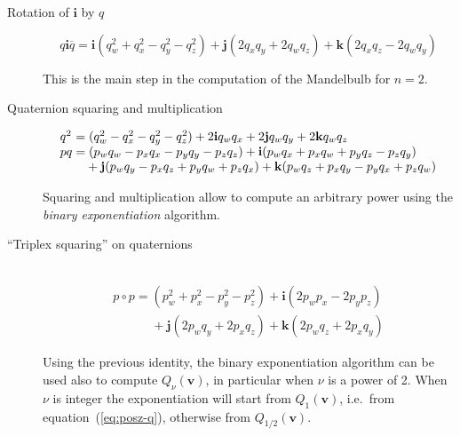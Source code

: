 \documentclass{article}
\let\vec\mathbf
\let\bar\overline
\newcommand{\mathnewlineeq}[1][\quad]{\\\phantom{#1 = }}
\begin{document}
\begin{description}
\item[Rotation of $\vec{i}$ by $q$]
\begin{equation*}
q\vec{i}\bar q =
  \vec{i}(q_w^2+q_x^2-q_y^2-q_z^2) + \vec{j} (2q_x q_y + 2q_w q_z)
  + \vec{k} (2 q_x q_z - 2 q_w q_y)
\end{equation*}

\noindent This is the main step in the computation of the Mandelbulb
for $n=2$.

\bigskip
\item[Quaternion squaring and multiplication]
\begin{equation*}
\begin{array}{l}
\hbox to 0pt{$q^2\hss$}\phantom{p q} =
  (q_w^2-q_x^2-q_y^2-q_z^2) + 2 \vec{i} q_w q_x + 2 \vec{j} q_w q_y
  + 2 \vec{k} q_w q_z\\
p q =       (p_w q_w - p_x q_x - p_y q_y - p_z q_z)
  + \vec{i} (p_w q_x + p_x q_w + p_y q_z - p_z q_y) \mathnewlineeq[p q]
  + \vec{j} (p_w q_y - p_x q_z + p_y q_w + p_z q_x)
  + \vec{k} (p_w q_z + p_x q_y - p_y q_x + p_z q_w)
\end{array}
\end{equation*}

\noindent
Squaring and multiplication allow to compute an arbitrary power using
the \emph{binary exponentiation} algorithm.

\bigskip
\item[``Triplex squaring'' on quaternions] ~\\
\begin{equation*}
\begin{array}{l}
p \circ p =
    (p_w^2 + p_x^2 - p_y^2 - p_z^2) + \vec{i} (2 p_w p_x - 2 p_y p_z)
\mathnewlineeq[p \circ p]
  + \vec{j} (2 p_w q_y + 2 p_x q_z) + \vec{k} (2 p_w q_z + 2 p_x q_y)
\end{array}
\end{equation*}

Using the previous identity, the binary exponentiation algorithm can
be used also to compute $Q_\nu(\vec{v})$, in particular when $\nu$ is a
power of 2.  When $\nu$ is integer the exponentiation will start
from $Q_1(\vec{v})$, i.e.~from equation~(\ref{eq:posz-q}),
otherwise from $Q_{1/2}(\vec{v})$.


\end{description}
\end{document}
